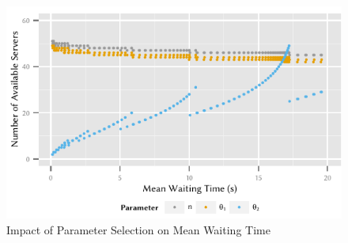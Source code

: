 \begin{figure}
  \centering
  \includegraphics{cloud/data_centers/performance_evaluation/figures/sorted_results}
  \caption{Impact of Parameter Selection on Mean Waiting Time}
  \label{fig:cloud:data_centers:performance_evaluation:sorted_results}
\end{figure}
